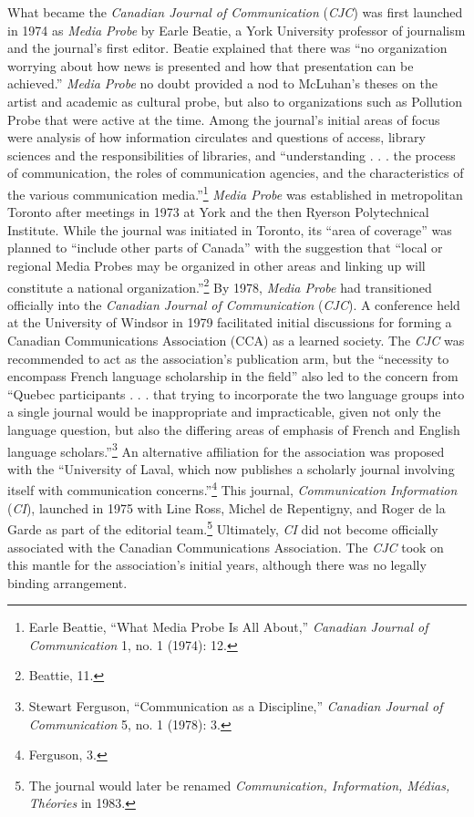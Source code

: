 \documentclass{tufte-handout}
\begin{document}
What became the \emph{Canadian Journal of Communication} (\emph{CJC})
was first launched in 1974 as \emph{Media Probe} by Earle Beatie, a York
University professor of journalism and the journal's first editor.
Beatie explained that there was ``no organization worrying about how
news is presented and how that presentation can be achieved.''
\emph{Media Probe} no doubt provided a nod to McLuhan's theses on the
artist and academic as cultural probe, but also to organizations such as
Pollution Probe that were active at the time. Among the journal's
initial areas of focus were analysis of how information circulates and
questions of access, library sciences and the responsibilities of
libraries, and ``understanding . . . the process of communication, the
roles of communication agencies, and the characteristics of the various
communication media.''\footnote{Earle Beattie, ``What Media Probe Is All
  About,'' \emph{Canadian Journal of Communication} 1, no. 1 (1974): 12.}
\emph{Media Probe} was established in metropolitan Toronto after
meetings in 1973 at York and the then Ryerson Polytechnical Institute.
While the journal was initiated in Toronto, its ``area of coverage'' was
planned to ``include other parts of Canada'' with the suggestion that
``local or regional Media Probes may be organized in other areas and
linking up will constitute a national organization.''\footnote{Beattie,
  11.} By 1978, \emph{Media Probe} had transitioned officially into the
\emph{Canadian Journal of Communication} (\emph{CJC}). A conference held
at the University of Windsor in 1979 facilitated initial discussions for
forming a Canadian Communications Association (CCA) as a learned
society. The \emph{CJC} was recommended to act as the association's
publication arm, but the ``necessity to encompass French language
scholarship in the field'' also led to the concern from ``Quebec
participants . . . that trying to incorporate the two language groups
into a single journal would be inappropriate and impracticable, given
not only the language question, but also the differing areas of emphasis
of French and English language scholars.''\footnote{Stewart Ferguson,
  ``Communication as a Discipline,'' \emph{Canadian Journal of
  Communication} 5, no. 1 (1978): 3.} An alternative affiliation for the
association was proposed with the ``University of Laval, which now
publishes a scholarly journal involving itself with communication
concerns.''\footnote{Ferguson, 3.} This journal, \emph{Communication
Information} (\emph{CI}), launched in 1975 with Line Ross, Michel de
Repentigny, and Roger de la Garde as part of the editorial
team.\footnote{The journal would later be renamed \emph{Communication,
  Information, Médias, Théories} in 1983.} Ultimately, \emph{CI} did not
become officially associated with the Canadian Communications
Association. The \emph{CJC} took on this mantle for the association's
initial years, although there was no legally binding arrangement.
\end{document}

